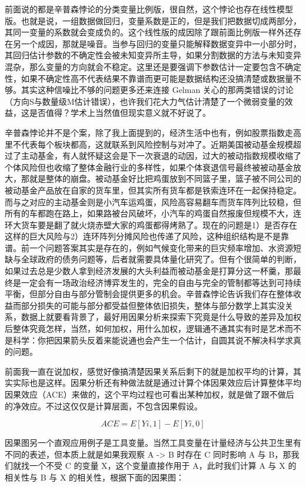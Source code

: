\documentclass[]{tufte-book}
\begin{document}
前面说的都是辛普森悖论的分类变量比例版，很自然，这个悖论也存在线性模型版。也就是说，一组数据做回归，变量系数是正的，但是我们把数据切成两部分，其同一变量的系数就会变成负的。这个线性版的成因除了跟前面比例版一样外还存在另一个成因，那就是噪音。当参与回归的变量只能解释数据变异中一小部分时，其回归估计参数的不确定性会被未知变异所主导，如果分割数据的方法与未知变异混杂，那么变量的方向就会不稳定。这里还是要强调下参数估计一定要包含不确定性，如果不确定性高不代表结果不靠谱而更可能是数据结构还没搞清楚或数据量不够。其实这种信噪比不够的问题更多还来连接 Gelman 关心的那两类错误的讨论（方向S与数量级M估计错误），也许我们花大力气估计清楚了一个微弱变量的效益，这是否值得？学术上当然值但现实意义就不好说了。

辛普森悖论并不是个案，除了我上面提到的，经济生活中也有，例如股票指数走高里不代表每个板块都高，这就联系到风险控制与对冲了。近期美国被动基金规模超过了主动基金，有人就怀疑这会是下一次衰退的动因，过大的被动指数规模收缩了个体风险但也收缩了整体金融行业的多样性，如果个体衰退信号最终被被动基金放大，那就是整体的崩盘。被动基金好比把鸡蛋放到不同篮子里，篮子被不同公司的被动基金产品放在自家的货车里，但其实所有货车都是铁索连环在一起保持稳定。而与之对应的主动基金则是小汽车运鸡蛋，风险高容易翻车而货车阵列比较稳，但所有的车都跑在路上，如果路被台风破坏，小汽车的鸡蛋自然报废但规模不大，连环大货车要是翻了就火烧赤壁大家的鸡蛋都得烤熟了。现在的问题是1）是否存在这样的巨大风险与2）连环阵列分摊风险也传递了风险，这种组织结构是不是靠谱。前一个问题答案其实是存在的，例如气候变化带来的巨灾频率增加、水资源短缺与全球政府的债务问题等，后者就需要具体量化研究了。但有个很简单的判断，如果过去总是少数人拿到经济发展的大头利益而被动基金是打算分这一杯羹，那最终是一定会有一场政治经济博弈发生的，完全的自由与完全的管制都等达到可持续平衡，但部分自由与部分管制会提供更多的机会。辛普森悖论告诉我们存在整体收益而部分损失的可能与部分都受益但整体依旧损失，整体与部分数学上其实没关系，数据上就要看背景了，最好用因果分析来探索下究竟是什么导致的差异及加权后整体究竟怎样，当然，如何加权，用什么加权，逻辑通不通其实有时是艺术而不是科学：你把因果箭头反着来能说通也会产生一个估计，自圆其说不解决科学求真的问题。

前面我一直在说加权，感觉好像搞清楚因果关系后剩下的就是加权平均的计算，其实实际也是这样。因果分析还有种做法就是通过计算个体因果效应后计算整体平均因果效应（ACE）来做的，这个平均过程也可看出某种加权，就是做了跟不做后的净效应。不过这仅仅是计算层面，不包含因果假设。

\[ACE = E[Y{i,1}] −E[Y{i,0}]\]

因果图另一个直观应用例子是工具变量。当然工具变量在计量经济与公共卫生里有不同的表述，但本质上就是如果我观察 A -\textgreater{} B 时存在 C 同时影响 A 与 B，那我们就找一个不受 C 的变量 X，这个变量直接作用于 A，此时我们计算 A 与 X 的相关性与 B 与 X 的相关性，根据下面的因果图：
\end{document}
